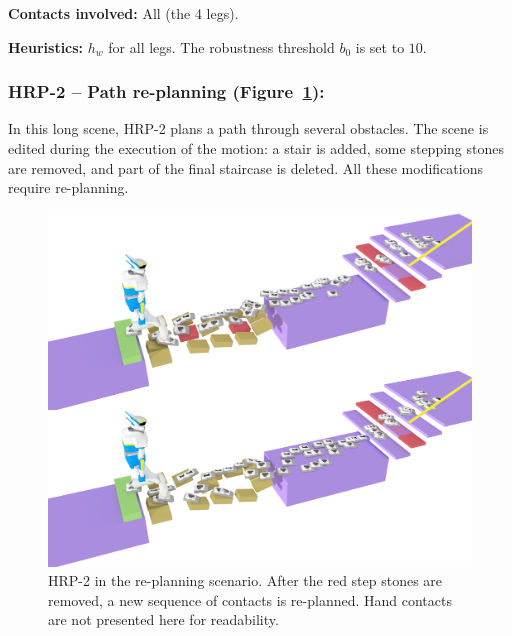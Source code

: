 \noindent\textbf{Contacts involved:} All (the 4 legs).

\noindent\textbf{Heuristics:} $h_w$ for all legs. The robustness threshold $b_0$ is set to $10$.


\subsubsection{HRP-2 -- Path re-planning (Figure~\ref{fig:re-planning}):}
In this long scene, HRP-2 plans a path through several obstacles. The scene is edited during the execution of the motion: a stair is added,
some stepping stones are removed, and part of the final staircase is deleted. All these modifications require re-planning.


\begin{figure}
  \centering
  \includegraphics[width=0.7\linewidth]{figures/replanning}
  \caption{
           HRP-2 in the re-planning scenario. After the red step stones are removed, a new sequence of contacts is re-planned. Hand contacts
           are not presented here for readability.}
		   \label{fig:re-planning}
\end{figure}

